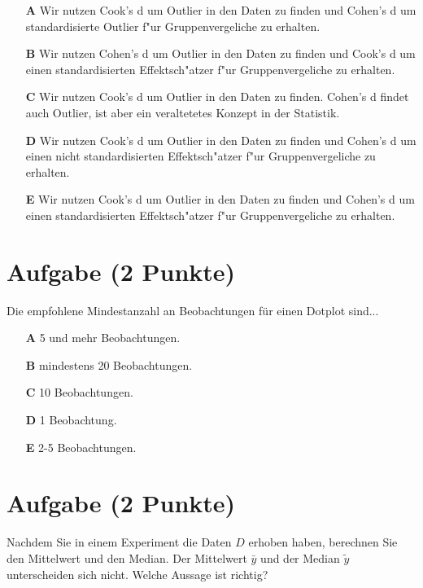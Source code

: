 \documentclass[a4paper, 10pt]{scrartcl}\usepackage[]{graphicx}\usepackage[]{xcolor}
\begin{document}
\begin{enumerate}
\item [\textbf{A} \msquare] Wir nutzen Cook's d um Outlier in den Daten zu finden und Cohen's d um standardisierte Outlier f{"u}r Gruppenvergeliche zu erhalten.
\item [\textbf{B} \msquare] Wir nutzen Cohen's d um Outlier in den Daten zu finden und Cook's d um einen standardisierten Effektsch{"a}tzer f{"u}r Gruppenvergeliche zu erhalten.
\item [\textbf{C} \msquare] Wir nutzen Cook's d um Outlier in den Daten zu finden. Cohen's d findet auch Outlier, ist aber ein veraltetetes Konzept in der Statistik.
\item [\textbf{D} \msquare] Wir nutzen Cook's d um Outlier in den Daten zu finden und Cohen's d um einen nicht standardisierten Effektsch{"a}tzer f{"u}r Gruppenvergeliche zu erhalten.
\item [\textbf{E} \msquare] Wir nutzen Cook's d um Outlier in den Daten zu finden und Cohen's d um einen standardisierten Effektsch{"a}tzer f{"u}r Gruppenvergeliche zu erhalten.
\end{enumerate}

\section{Aufgabe \hfill (2 Punkte)}



Die empfohlene Mindestanzahl an Beobachtungen f{\"u}r einen Dotplot sind...



\begin{enumerate}
\item [\textbf{A} \msquare] 5 und mehr Beobachtungen.
\item [\textbf{B} \msquare] mindestens 20 Beobachtungen.
\item [\textbf{C} \msquare] 10 Beobachtungen.
\item [\textbf{D} \msquare] 1 Beobachtung.
\item [\textbf{E} \msquare] 2-5 Beobachtungen.
\end{enumerate} 

\section{Aufgabe \hfill (2 Punkte)}



Nachdem Sie in einem Experiment die Daten $D$ erhoben haben, berechnen Sie den
Mittelwert und den Median. Der Mittelwert $\bar{y}$ und der Median
$\tilde{y}$ unterscheiden sich nicht. Welche Aussage ist richtig?
\end{document}
